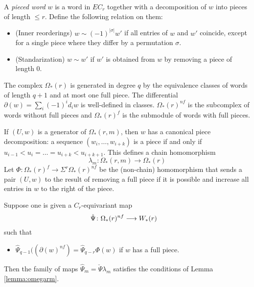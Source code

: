 A \emph{pieced word} $w$ is a word in $EC_r$ together with a decomposition of $w$ into pieces of length $\leq r$. Define the following relation on them:
\begin{itemize}
	\item (Inner reorderings) $w\sim (-1)^{|\sigma|}w'$ if all entries of $w$ and $w'$ coincide, except for a single piece where they differ by a permutation $\sigma$.
	\item (Standarization) $w\sim w'$ if $w'$ is obtained from $w$ by removing a piece of length $0$.
\end{itemize}
The complex $\Omega_*(r)$ is generated in degree $q$ by the equivalence classes of words of length $q+1$ and at most one full piece.
The differential $\partial(w) = \sum_{i} (-1)^id_iw$ is well-defined in classes. $\Omega_*(r)^{nf}$ is the subcomplex of words without full pieces and $\Omega_*(r)^{f}$ is the submodule of words with full pieces.

If $(U,w)$ is a generator of $\Omega_*(r,m)$, then $w$ has a canonical piece decomposition: a sequence $(w_i,\ldots,w_{i+k})$ is a piece if and only if $u_{i-1}<u_i =\ldots= u_{i+k}<u_{i+k+1}$. This defines a chain homomorphism
\[\lambda_m\colon \Omega_*(r,m)\to \Omega_*(r)\]
Let $\Phi\colon \Omega_*(r)^f\to \Sigma^{r}\Omega_{*}(r)^{nf}$ be the (non-chain) homomorphism that sends a pair $(U,w)$ to the result of removing a full piece if it is possible and increase all entries in $w$ to the right of the piece.



\begin{lemma} \label{lemma:omegar}
	Suppose one is given a $C_r$-equivariant map
	\begin{align*}
		\check{\Psi}\colon \Omega_*(r)^{nf}&\longrightarrow W_*(r)
	\end{align*}
	such that
	\begin{itemize}
		\item $\hat{\Psi}_{q-1}((\partial (w)^{nf}) = \hat{\Psi}_{q-r}\Phi(w)$ if $w$ has a full piece.
	\end{itemize}
	Then the family of maps $\hat{\Psi}_m = \check{\Psi}\lambda_m$ satisfies the conditions of Lemma \ref{lemma:omegarm}.
\end{lemma}

